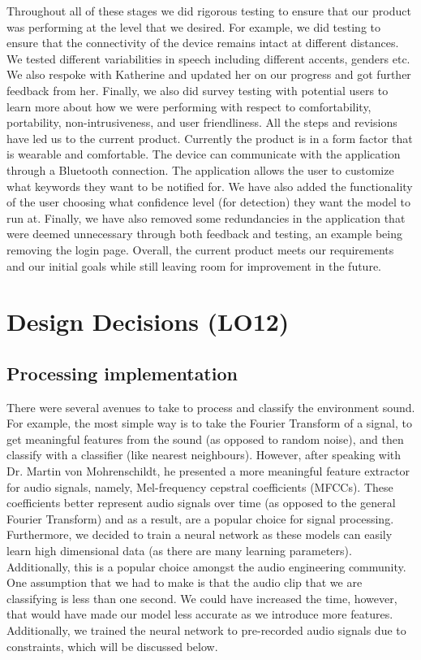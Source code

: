 \documentclass{article}
\begin{document}
\newline
\newline Throughout all of these stages we did rigorous testing to ensure that our product was performing at the level that we desired. For example, we did testing to ensure that the connectivity of the device remains intact at different distances. We tested different variabilities in speech including different accents, genders etc. We also respoke with Katherine and updated her on our progress and got further feedback from her. Finally, we also did survey testing with potential users to learn more about how we were performing with respect to comfortability, portability, non-intrusiveness, and user friendliness.      
\newline
\newline All the steps and revisions have led us to the current product. Currently the product is in a form factor that is wearable and comfortable. The device can communicate with the application through a Bluetooth connection. The application allows the user to customize what keywords they want to be notified for. We have also added the functionality of the user choosing what confidence level (for detection) they want the model to run at. Finally, we have also removed some redundancies in the application that were deemed unnecessary through both feedback and testing, an example being removing the login page. Overall, the current product meets our requirements and our initial goals while still leaving room for improvement in the future.

\section{Design Decisions (LO12)}

\subsection{Processing implementation}
There were several avenues to take to process and classify the environment sound. For example, the most simple way is to take the Fourier Transform of a signal, to get meaningful features from the sound (as opposed to random noise), and then classify with a classifier (like nearest neighbours). However, after speaking with Dr. Martin von Mohrenschildt, he presented a more meaningful feature extractor for audio signals, namely, Mel-frequency cepstral coefficients (MFCCs). These coefficients better represent audio signals over time (as opposed to the general Fourier Transform) and as a result, are a popular choice for signal processing. Furthermore, we decided to train a neural network as these models can easily learn high dimensional data (as there are many learning parameters). Additionally, this is a popular choice amongst the audio engineering community. One assumption that we had to make is that the audio clip that we are classifying is less than one second. We could have increased the time, however, that would have made our model less accurate as we introduce more features. Additionally, we trained the neural network to pre-recorded audio signals due to constraints, which will be discussed below. 
\end{document}
